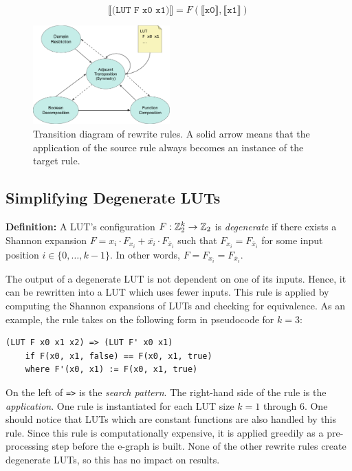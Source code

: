 \begin{equation}
    \llbracket \texttt{(LUT F x0 x1)} \rrbracket = F(\llbracket \texttt{x0} \rrbracket, \llbracket \texttt{x1} \rrbracket)
\end{equation}

\begin{figure}
    \centering
    \includegraphics[width=0.47\textwidth]{img/rewrites.pdf}
    \caption{Transition diagram of rewrite rules. A solid arrow means that the application of the source rule always becomes an instance of the target rule.}\label{fig:rewrites}
\end{figure}

\subsection{Simplifying Degenerate LUTs}\label{sec:rewrites:degen}

\textbf{Definition:} A LUT's configuration $F : \mathbb{Z}_{2}^{k} \rightarrow \mathbb{Z}_{2}$ is \textit{degenerate} if there exists a Shannon expansion $F = x_i \cdot F_{x_i} + \overline{x_i} \cdot F_{\overline{x}_i}$
such that $F_{x_i} = F_{\overline{x}_i}$ for some input position $i \in \{ 0, \ldots, k -1\}$. In other words, $F = F_{x_i} = F_{\overline{x}_i}$.

The output of a degenerate LUT is not dependent on one of its inputs. Hence, it
can be rewritten into a LUT which uses fewer inputs. This rule is applied by
computing the Shannon expansions of LUTs and checking for equivalence. As an
example, the rule takes on the following form in pseudocode for $k=3$:

\begin{lstlisting}
(LUT F x0 x1 x2) => (LUT F' x0 x1)
    if F(x0, x1, false) == F(x0, x1, true)
    where F'(x0, x1) := F(x0, x1, true)
\end{lstlisting}

On the left of \texttt{=>} is the \textit{search pattern}. The right-hand side
of the rule is the \textit{application}. One rule is instantiated for each LUT
size $k =1$ through 6. One should notice that LUTs which are constant functions
are also handled by this rule. Since this rule is computationally expensive, it
is applied greedily as a pre-processing step before the e-graph is built. None
of the other rewrite rules create degenerate LUTs, so this has no impact on
results.

